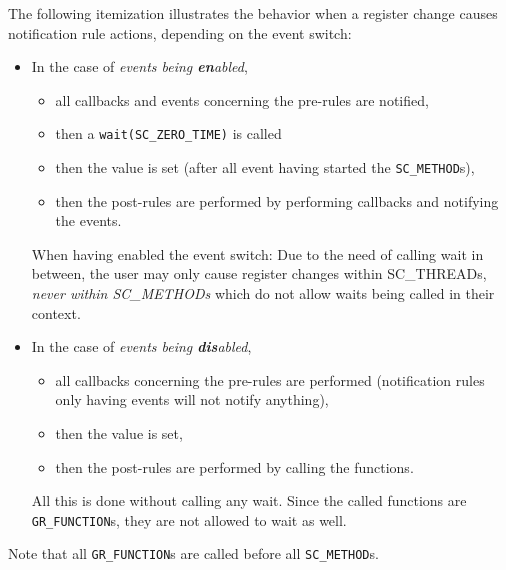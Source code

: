 The following itemization illustrates the behavior when a register change causes notification rule actions, depending on the event switch:
\begin{itemize}

  \item In the case of {\em events being {\bf \em en}abled},
  \begin{itemize}
    \item all callbacks and events concerning the pre-rules are notified,
    \item then a \lstinline|wait(SC_ZERO_TIME)| is called
    \item then the value is set (after all event having started the \lstinline|SC_METHOD|s),
    \item then the post-rules are performed by performing callbacks and notifying the events.
  \end{itemize}
  When having enabled the event switch: Due to the need of calling wait in between, the user may only cause register changes within SC\_THREADs, {\em never within SC\_METHODs} which do not allow waits being called in their context.

  \item In the case of {\em events being {\bf \em dis}abled},
  \begin{itemize}
    \item all callbacks concerning the pre-rules are performed (notification rules only having events will not notify anything),
    \item then the value is set,
    \item then the post-rules are performed by calling the functions.
  \end{itemize}
  All this is done without calling any wait. Since the called functions are \lstinline|GR_FUNCTION|s, they are not allowed to wait as well.
  
\end{itemize}

Note that all \lstinline|GR_FUNCTION|s are called before all \lstinline|SC_METHOD|s.




